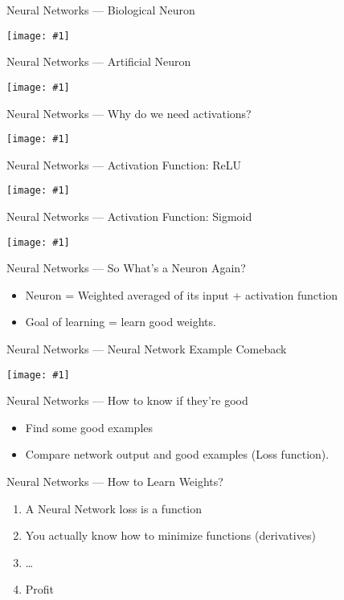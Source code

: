 \documentclass{beamer}
\newcommand\cimgg[1]{\vfill\centerline{\texttt{[image: \#1]}}\vfill}
\begin{document}
\begin{frame}{Neural Networks --- Biological Neuron}
  \cimgg{neuron.png}
\end{frame}

\begin{frame}{Neural Networks --- Artificial Neuron}
  \cimgg{neuron-model.png}
\end{frame}

\begin{frame}{Neural Networks --- Why do we need activations?}
  \cimgg{xor.png}
\end{frame}

\begin{frame}{Neural Networks --- Activation Function: ReLU}
  \cimgg{relu.png}
\end{frame}

\begin{frame}{Neural Networks --- Activation Function: Sigmoid}
  \cimgg{activation.jpeg}
\end{frame}

\begin{frame}{Neural Networks --- So What's a Neuron Again?}
  \begin{itemize}
  \item   Neuron = Weighted averaged of its input + activation function
  \item   Goal of learning = learn good weights.
  \end{itemize}
\end{frame}

\begin{frame}{Neural Networks --- Neural Network Example Comeback}
  \cimgg{neural-network.png}
\end{frame}

\begin{frame}{Neural Networks --- How to know if they're good}
  \begin{itemize}
  \item Find some good examples
  \item Compare network output and good examples (Loss function).
  \end{itemize}
\end{frame}

\begin{frame}{Neural Networks --- How to Learn Weights?}
  \begin{enumerate}
  \item A Neural Network loss is a function
  \item You actually know how to minimize functions (derivatives)
  \item …
  \item Profit
  \end{enumerate}
\end{frame}
\end{document}
